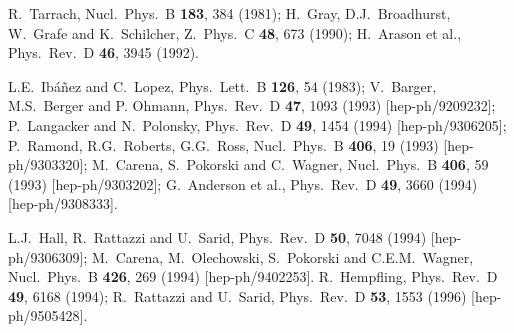 \documentclass[11pt]{article}
\begin{document}
\begin{thebibliography}{999}
R.~Tarrach, 
  Nucl.\ Phys.\ B {\bf 183}, 384 (1981);
H.~Gray, D.J.~Broadhurst, W.~Grafe and K.~Schilcher,
  Z.\ Phys.\ C {\bf 48}, 673 (1990);
H.~Arason et al., 
  Phys.\ Rev.\ D {\bf 46}, 3945 (1992).

L.E.~Ib\'a\~nez and C.~Lopez, 
  Phys.\ Lett.\ B {\bf 126}, 54 (1983);
V.~Barger, M.S.~Berger and P. Ohmann, 
  Phys.\ Rev.\ D {\bf 47}, 1093 (1993)
  [hep-ph/9209232];
P.~Langacker and N.~Polonsky, 
  Phys.\ Rev.\ D {\bf 49}, 1454 (1994)
  [hep-ph/9306205];
P.~Ramond, R.G.~Roberts, G.G.~Ross,
  Nucl.\ Phys.\ B {\bf 406}, 19 (1993)
  [hep-ph/9303320];
M.~Carena, S.~Pokorski and C.~Wagner,
  Nucl.\ Phys.\ B {\bf 406}, 59 (1993)
  [hep-ph/9303202];
G.~Anderson et al.,
  Phys.\ Rev.\ D {\bf 49}, 3660 (1994)
  [hep-ph/9308333].

L.J.~Hall, R.~Rattazzi and U.~Sarid,
  Phys.\ Rev.\ D {\bf 50}, 7048 (1994)
  [hep-ph/9306309];
M.~Carena, M.~Olechowski, S.~Pokorski and C.E.M.~Wagner,
  Nucl.\ Phys.\ B {\bf 426}, 269 (1994)
  [hep-ph/9402253].
R.~Hempfling, 
  Phys.\ Rev.\ D {\bf 49}, 6168 (1994);
R.~Rattazzi and U.~Sarid, 
  Phys.\ Rev.\ D {\bf 53}, 1553 (1996)
  [hep-ph/9505428].



\end{thebibliography}
\end{document}
